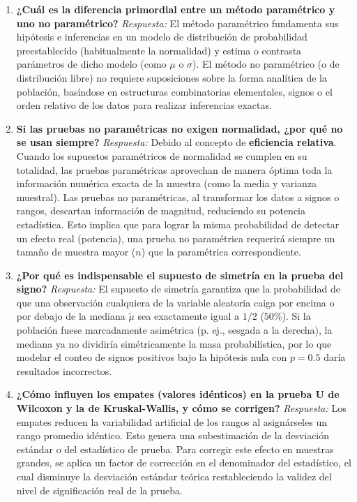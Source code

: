 \documentclass[11pt,a4paper]{article}
\begin{document}
\begin{enumerate}
    \item \textbf{¿Cuál es la diferencia primordial entre un método paramétrico y uno no paramétrico?}
    \textit{Respuesta:} El método paramétrico fundamenta sus hipótesis e inferencias en un modelo de distribución de probabilidad preestablecido (habitualmente la normalidad) y estima o contrasta parámetros de dicho modelo (como $\mu$ o $\sigma$). El método no paramétrico (o de distribución libre) no requiere suposiciones sobre la forma analítica de la población, basíndose en estructuras combinatorias elementales, signos o el orden relativo de los datos para realizar inferencias exactas.

    \item \textbf{Si las pruebas no paramétricas no exigen normalidad, ¿por qué no se usan siempre?}
    \textit{Respuesta:} Debido al concepto de \textbf{eficiencia relativa}. Cuando los supuestos paramétricos de normalidad se cumplen en su totalidad, las pruebas paramétricas aprovechan de manera óptima toda la información numérica exacta de la muestra (como la media y varianza muestral). Las pruebas no paramétricas, al transformar los datos a signos o rangos, descartan información de magnitud, reduciendo su potencia estadística. Esto implica que para lograr la misma probabilidad de detectar un efecto real (potencia), una prueba no paramétrica requerirá siempre un tamaño de muestra mayor ($n$) que la paramétrica correspondiente.

    \item \textbf{¿Por qué es indispensable el supuesto de simetría en la prueba del signo?}
    \textit{Respuesta:} El supuesto de simetría garantiza que la probabilidad de que una observación cualquiera de la variable aleatoria caiga por encima o por debajo de la mediana $\tilde{\mu}$ sea exactamente igual a $1/2$ ($50\%$). Si la población fuese marcadamente asimétrica (p. ej., sesgada a la derecha), la mediana ya no dividiría simétricamente la masa probabilística, por lo que modelar el conteo de signos positivos bajo la hipótesis nula con $p=0.5$ daría resultados incorrectos.

    \item \textbf{¿Cómo influyen los empates (valores idénticos) en la prueba U de Wilcoxon y la de Kruskal-Wallis, y cómo se corrigen?}
    \textit{Respuesta:} Los empates reducen la variabilidad artificial de los rangos al asignárseles un rango promedio idéntico. Esto genera una subestimación de la desviación estándar o del estadístico de prueba. Para corregir este efecto en muestras grandes, se aplica un factor de corrección en el denominador del estadístico, el cual disminuye la desviación estándar teórica restableciendo la validez del nivel de significación real de la prueba.


\end{enumerate}
\end{document}
